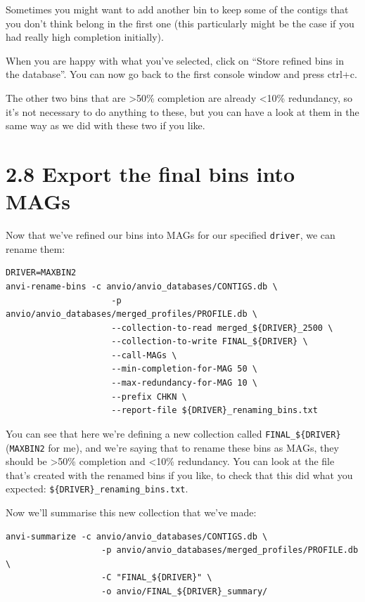 \documentclass[
]{book}
\begin{document}
Sometimes you might want to add another bin to keep some of the contigs that you don't think belong in the first one (this particularly might be the case if you had really high completion initially).

When you are happy with what you've selected, click on ``Store refined bins in the database''. You can now go back to the first console window and press ctrl+c.

The other two bins that are \textgreater50\% completion are already \textless10\% redundancy, so it's not necessary to do anything to these, but you can have a look at them in the same way as we did with these two if you like.

\section{2.8 Export the final bins into MAGs}\label{export-the-final-bins-into-mags}

Now that we've refined our bins into MAGs for our specified \texttt{driver}, we can rename them:

\begin{verbatim}
DRIVER=MAXBIN2
anvi-rename-bins -c anvio/anvio_databases/CONTIGS.db \
                     -p anvio/anvio_databases/merged_profiles/PROFILE.db \
                     --collection-to-read merged_${DRIVER}_2500 \
                     --collection-to-write FINAL_${DRIVER} \
                     --call-MAGs \
                     --min-completion-for-MAG 50 \
                     --max-redundancy-for-MAG 10 \
                     --prefix CHKN \
                     --report-file ${DRIVER}_renaming_bins.txt
\end{verbatim}

You can see that here we're defining a new collection called \texttt{FINAL\_\$\{DRIVER\}} (\texttt{MAXBIN2} for me), and we're saying that to rename these bins as MAGs, they should be \textgreater50\% completion and \textless10\% redundancy. You can look at the file that's created with the renamed bins if you like, to check that this did what you expected: \texttt{\$\{DRIVER\}\_renaming\_bins.txt}.

Now we'll summarise this new collection that we've made:

\begin{verbatim}
anvi-summarize -c anvio/anvio_databases/CONTIGS.db \
                   -p anvio/anvio_databases/merged_profiles/PROFILE.db \
                   -C "FINAL_${DRIVER}" \
                   -o anvio/FINAL_${DRIVER}_summary/
\end{verbatim}
\end{document}
